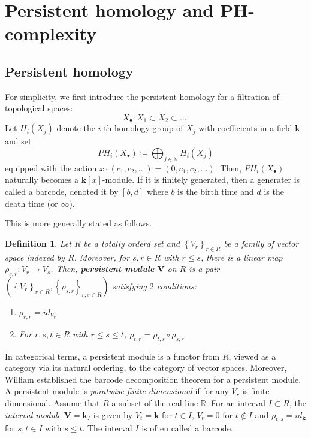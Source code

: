 \documentclass[12pt]{amsart}
\numberwithin{equation}{section}
\newcommand{\N}{\mathbb{N}}
\newcommand{\R}{\mathbb{R}}
\newtheorem{dfn}[thm]{\bf Definition}
\begin{document}
\section{Persistent homology and PH-complexity}
\subsection{Persistent homology}
For simplicity, we first introduce the persistent homology for a filtration of topological spaces: 
\begin{equation*}
    X_\bullet \colon X_1 \subset X_2 \subset \dots .
\end{equation*} 
\indent
Let $H_i (X_j)$ denote the $i$-th homology group of $X_j$ with coefficients in a field $\mathbf{k}$ and set
\begin{equation*}
    PH_i (X_\bullet) \coloneqq \bigoplus_{j\in \N} H_i(X_j)
\end{equation*}
equipped with the action $x\cdot (c_1, c_2, \dots) = (0, c_1, c_2, \dots)$. 
Then, $PH_i(X_\bullet)$ naturally becomes a $\mathbf{k} [x] $-module. 
If it is finitely generated, then a generater is called a barcode, denoted it by $[b,d]$ where $b$ is the birth time and $d$ is the death time (or $\infty$). 



\indent
This is more generally stated as follows. 
\begin{dfn}
    Let $R$ be a totally orderd set and  $\left\{V_r\right\}_{r\in R}$ be a family of vector space indexed by $R$. 
    Moreover, for $s,r\in R$ with $r\leq s$, there is a linear map $\rho_{s,r}\colon V_r \rightarrow V_s$. 
    Then, \textbf{persistent module} $\mathbf{V}$ on $R$ is a pair $\left(\left\{V_r\right\}_{r\in R}, \left\{\rho_{s,r}\right\}_{r,s\in R} \right)$ satisfying $2$ conditions:
    \begin{enumerate}
        \item $\rho_{r,r} = id_{V_r}$
        \item For $r,s,t \in R$ with $r\leq s \leq t$, $\rho_{t,r} = \rho_{t,s} \circ \rho_{s,r}$
    \end{enumerate}
\end{dfn}
In categorical terms, a persistent module is a functor from $R$, viewed as a category via its natural ordering, to the category of vector spaces.
Moreover, William \cite{W15} established the barcode decomposition theorem for a persistent module. 
A persistent module is {\em pointwise finite-dimensional} if for any $V_r$ is finite dimensional. 
Assume that $R$ a subset of the real line $\R$. 
For an interval $I \subset R$, the {\em interval module} $\mathbf{V} = \mathbf{k}_I$ is given by $V_t = \mathbf{k}$ for $t \in I$, $V_t = 0$ for $t \notin I$ and $\rho_{t,s} = id_{\mathbf{k}}$ for $s,t \in I$ with $s\leq t$. 
The interval $I$ is often called a barcode. 
\end{document}
